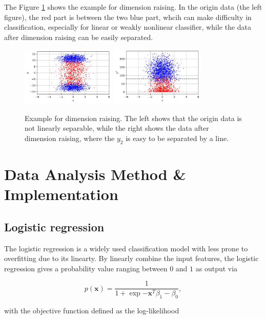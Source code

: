 \documentclass[11pt]{article}
\begin{document}
The Figure \ref{sample-raising} shows the example for dimension raising. In the origin data (the left figure), the red part is between the two blue part, whcih can make difficulty in classification, especially for linear or weakly nonlinear classifier, while the data after dimension raising can be easily separated.

\begin{figure}[H]
  \centering
  \includegraphics[width=0.4\textwidth]{./figure/Sample-Raising-1.jpg}
  \includegraphics[width=0.4\textwidth]{./figure/Sample-Raising-2.jpg}
  \caption{Example for dimension raising. The left shows that the origin data is not linearly separable, while the right shows the data after dimension raising, where the $y_2$ is easy to be separated by a line.}
  \label{sample-raising}
\end{figure}

\section{Data Analysis Method \& Implementation}

\subsection{Logistic regression}

The logistic regression is a widely used classification model with less prone to overfitting due to its linearty. By linearly combine the input features, the logistic regression gives a probability value ranging between $0$ and $1$ as output via

$$
  p (\mathbf{x}) = \frac{1}{1 + \exp{- \mathbf{x}^T \beta_1 - \beta_0}},
$$

\noindent with the objective function defined as the log-likelihood
\end{document}

